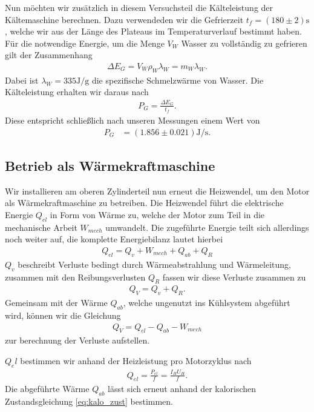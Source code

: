Nun möchten wir zusätzlich in diesem Versuchsteil die Kälteleistung der Kältemaschine berechnen. Dazu verwendeden wir die Gefrierzeit $t_f = (180 \pm 2)\si{\second}$, welche wir aus der Länge des Plateaus im Temperaturverlauf bestimmt haben. Für die notwendige Energie, um die Menge $V_W$ Wasser zu vollständig zu gefrieren gilt der Zusammenhang
\begin{align}
    \Delta E_G = V_W \rho_W \lambda_W = m_W \lambda_W.
\end{align}
Dabei ist $\lambda_W = 335\si{\joule\per\gram}$ die spezifische Schmelzwärme von Wasser. Die Kälteleistung erhalten wir daraus nach
\begin{align}
    P_G = \frac{\Delta E_G}{t_f}.
\end{align}
Diese entspricht schließlich nach unseren Messungen einem Wert von
\begin{align}
    P_G &= (1.856 \pm 0.021)\si{\joule\per\second}.
\end{align}

\subsection{Betrieb als Wärmekraftmaschine}

Wir installieren am oberen Zylinderteil nun erneut die Heizwendel, um den Motor als Wärmekraftmaschine zu betreiben. Die Heizwendel führt die elektrische Energie $Q_{el}$ in Form von Wärme zu, welche der Motor zum Teil in die mechanische Arbeit $W_{mech}$ umwandelt. Die zugeführte Energie teilt sich allerdings noch weiter auf, die komplette Energiebilanz lautet hierbei
\begin{align}
    Q_{el} = Q_v + W_{mech} + Q_{ab} + Q_R
\end{align}
$Q_v$ beschreibt Verluste bedingt durch Wärmeabstrahlung und Wärmeleitung, zusammen mit den Reibungsverlusten $Q_R$ fassen wir diese Verluste zusammen zu
\begin{align}
    Q_{V} = Q_v + Q_R.
\end{align}
Gemeinsam mit der Wärme $Q_{ab}$, welche ungenutzt ins Kühlsystem abgeführt wird, können wir die Gleichung
\begin{align}
    Q_{V} = Q_{el} - Q_{ab} - W_{mech} \label{eq:Q_V}
\end{align}
zur berechnung der Verluste aufstellen.

$Q_el$ bestimmen wir anhand der Heizleistung pro Motorzyklus nach
\begin{align}
    Q_{el} = \frac{P_{el}}{f} = \frac{I_H U_H}{f}.
\end{align}
Die abgeführte Wärme $Q_{ab}$ lässt sich erneut anhand der kalorischen Zustandsgleichung \eqref{eq:kalo_zust} bestimmen. 

